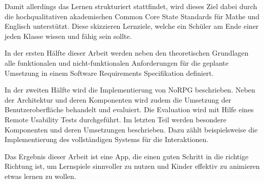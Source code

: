 	Damit allerdings das Lernen strukturiert stattfindet, wird dieses Ziel dabei durch die hochqualitativen akademischen Common Core State Standards für Mathe und Englisch unterstützt. Diese skizzieren Lernziele, welche ein Schüler am Ende einer jeden Klasse wissen und fähig sein sollte.
	
	In der ersten Hälfte dieser Arbeit werden neben den theoretischen Grundlagen alle funktionalen und nicht-funktionalen Anforderungen für die geplante Umsetzung in einem Software Requirements Specifikation definiert.
	
	In der zweiten Hälfte wird die Implementierung von NoRPG beschrieben. Neben der Architektur und deren Komponenten wird zudem die Umsetzung der Benutzeroberfläche behandelt und evaluiert. Die Evaluation wird mit Hilfe eines Remote Usability Tests durchgeführt. Im letzten Teil werden besondere Komponenten und deren Umsetzungen beschrieben. Dazu zählt beispielsweise die Implementierung des vollständigen Systems für die Interaktionen.
	
	Das Ergebnis dieser Arbeit ist eine App, die einen guten Schritt in die richtige Richtung ist, um Lernspiele sinnvoller zu nutzen und Kinder effektiv zu animieren etwas lernen zu wollen. 